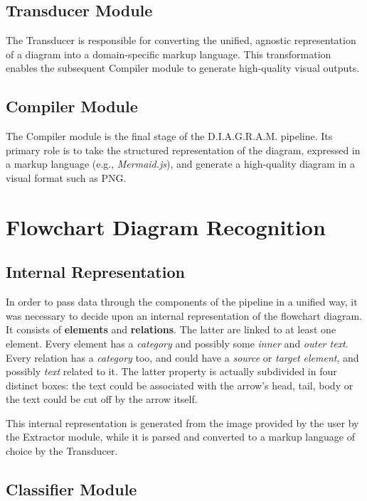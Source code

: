 \documentclass[conference]{IEEEtran}
\begin{document}
\subsection{Transducer Module}
The Transducer is responsible for converting the unified, agnostic representation of a diagram into a domain-specific markup language. 
This transformation enables the subsequent Compiler module to generate high-quality visual outputs.
\subsection{Compiler Module}
The Compiler module is the final stage of the D.I.A.G.R.A.M. pipeline. 
Its primary role is to take the structured representation of the diagram, expressed in a markup language (e.g., \textit{Mermaid.js}), and generate a high-quality diagram in a visual format such as PNG. 

% 
%
\section{Flowchart Diagram Recognition}

\subsection{Internal Representation}
In order to pass data through the components of the pipeline in a unified way, it was necessary to decide upon an internal representation of the flowchart diagram. It consists of \textbf{elements} and \textbf{relations}. The latter are linked to at least one element. Every element has a \textit{category} and possibly some \textit{inner} and \textit{outer text}. Every relation has a \textit{category} too, and could have a \textit{source} or \textit{target element}, and possibly \textit{text} related to it. The latter property is actually subdivided in four distinct boxes: the text could be associated with the arrow's head, tail, body or the text could be cut off by the arrow itself.

This internal representation is generated from the image provided by the user by the Extractor module, while it is parsed and converted to a markup language of choice by the Transducer. 

\subsection{Classifier Module}
\end{document}
